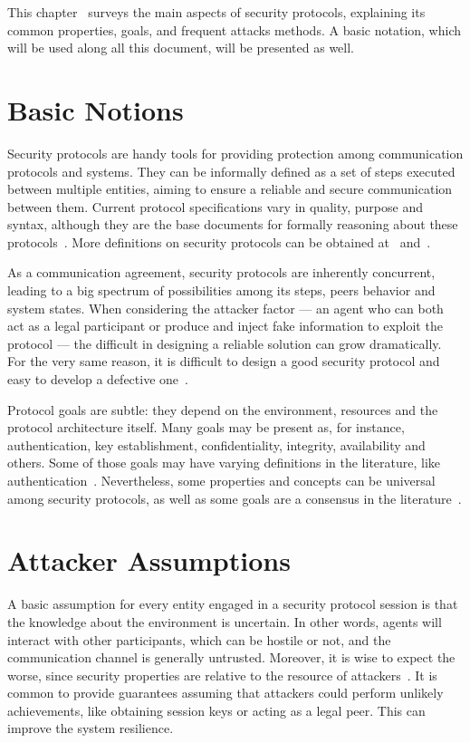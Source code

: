 This chapter~\label{chap:sec-protocols} surveys the main aspects of security protocols, explaining its common properties, goals, and frequent attacks methods. A basic notation, which will be used along all this document, will be presented as well.





\section{Basic Notions}
Security protocols are handy tools for providing protection among communication protocols and systems. They can be informally defined as a set of steps executed between multiple entities, aiming to ensure a reliable and secure communication between them. Current protocol specifications vary in quality, purpose and syntax, although they are the base documents for formally reasoning about these protocols~\cite{Abadi99}. More definitions on security protocols can be obtained at~\cite{BoydMathuria2008} and~\cite{RyanSchneider2010}.

As a communication agreement, security protocols are inherently concurrent, leading to a big spectrum of possibilities among its steps, peers behavior and system states. When considering the attacker factor --- an agent who can both act as a legal participant or produce and inject fake information to exploit the protocol --- the difficult in designing a reliable solution can grow dramatically. For the very same reason, it is difficult to design a good security protocol and easy to develop a defective one~\cite{Bella2007}.

Protocol goals are subtle: they depend on the environment, resources and the protocol architecture itself. Many goals may be present as, for instance, authentication, key establishment, confidentiality, integrity, availability and others. Some of those goals may have varying definitions in the literature, like authentication~\cite{Abadi99}. Nevertheless, some properties and concepts can be universal among security protocols, as well as some goals are a consensus in the literature~\cite{RyanSchneider2010}.





\section{Attacker Assumptions}
A basic assumption for every entity engaged in a security protocol session is that the knowledge about the environment is uncertain. In other words, agents will interact with other participants, which can be hostile or not, and the communication channel is generally untrusted. Moreover, it is wise to expect the worse, since security properties are relative to the resource of attackers~\cite{BoydMathuria2008}. It is common to provide guarantees assuming that attackers could perform unlikely achievements, like obtaining session keys or acting as a legal peer. This can improve the system resilience.

